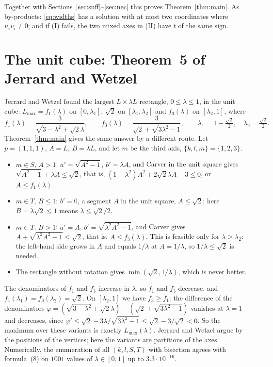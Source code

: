 \documentclass[11pt]{article}
\theoremstyle{definition}
\theoremstyle{remark}
\begin{document}
Together with Sections~\ref{sec:suff}--\ref{sec:nec} this proves Theorem~\ref{thm:main}. As by-products:
\eqref{eq:widths} has a solution with at most two coordinates where $u_iv_i\ne0$; and if (I) fails, the two mixed
axes in (II) have $t$ of the same sign.

\section{The unit cube: Theorem~5 of Jerrard and Wetzel}\label{sec:jw}

Jerrard and Wetzel \cite[Theorem~5, formula~(8)]{JerrardWetzel2004} found the largest $L\times\lambda L$
rectangle, $0\le\lambda\le1$, in the unit cube:
$L_{\max}=f_1(\lambda)$ on $[0,\lambda_1]$, $\sqrt2$ on $[\lambda_1,\lambda_2]$ and $f_3(\lambda)$ on $[\lambda_2,1]$, where
\[
f_1(\lambda)=\frac{3}{\sqrt{3-\lambda^2}+\sqrt2\lambda},\qquad f_3(\lambda)=\frac{3}{\sqrt2+\sqrt{3\lambda^2-1}},\qquad
\lambda_1=1-\tfrac{\sqrt2}{2},\quad \lambda_2=\tfrac{\sqrt2}{2}.
\]
Theorem~\ref{thm:main} gives the same answer by a different route. Let $p=(1,1,1)$, $A=L$, $B=\lambda L$, and let $m$
be the third axis, $\{k,l,m\}=\{1,2,3\}$.
\begin{itemize}
\item $m\in S$, $A>1$: $a'=\sqrt{A^2-1}$, $b'=\lambda A$, and Carver in the unit square gives
$\sqrt{A^2-1}+\lambda A\le\sqrt2$, that is, $(1-\lambda^2)A^2+2\sqrt2\lambda A-3\le0$, or $A\le f_1(\lambda)$.
\item $m\in T$, $B\le1$: $b'=0$, a segment $A$ in the unit square, $A\le\sqrt2$; here $B=\lambda\sqrt2\le1$ means $\lambda\le\sqrt2/2$.
\item $m\in T$, $B>1$: $a'=A$, $b'=\sqrt{\lambda^2A^2-1}$, and Carver gives $A+\sqrt{\lambda^2A^2-1}\le\sqrt2$, that is,
$A\le f_3(\lambda)$. This is feasible only for $\lambda\ge\lambda_2$: the left-hand side grows in $A$ and equals
$1/\lambda$ at $A=1/\lambda$, so $1/\lambda\le\sqrt2$ is needed.
\item The rectangle without rotation gives $\min(\sqrt2,1/\lambda)$, which is never better.
\end{itemize}
The denominators of $f_1$ and $f_3$ increase in $\lambda$, so $f_1$ and $f_3$ decrease, and $f_1(\lambda_1)=f_3(\lambda_2)=\sqrt2$.
On $[\lambda_2,1]$ we have $f_3\ge f_1$: the difference of the denominators
$\varphi=(\sqrt{3-\lambda^2}+\sqrt2\lambda)-(\sqrt2+\sqrt{3\lambda^2-1})$ vanishes at $\lambda=1$ and decreases, since
$\varphi'\le\sqrt2-3\lambda/\sqrt{3\lambda^2-1}\le\sqrt2-3/\sqrt2<0$. So the maximum over these variants is exactly
$L_{\max}(\lambda)$. Jerrard and Wetzel argue by the positions of the vertices; here the variants are partitions of
the axes. Numerically, the enumeration of all $(k,l,S,T)$ with bisection agrees with formula~(8) on $1001$ values of
$\lambda\in[0,1]$ up to $3.3\cdot10^{-16}$.
\end{document}

